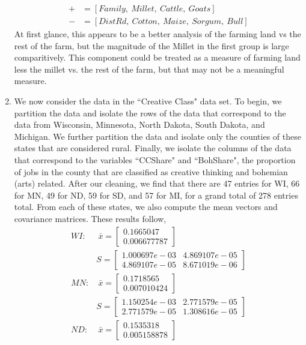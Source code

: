\documentclass[letterpaper,10pt]{article}
\begin{document}
\begin{enumerate}
\begin{align*}
+ &=[Family,\ Millet,\ Cattle,\ Goats]\\
- &=[DistRd,\ Cotton,\ Maize,\ Sorgum,\ Bull]
\end{align*}
At first glance, this appears to be a better analysis of the farming land vs the rest of the farm, but the magnitude of the Millet in the first group is large comparitively. This component could be treated as a measure of farming land less the millet vs. the rest of the farm, but that may not be a meaningful measure.
\item We now consider the data in the ``Creative Class" data set. To begin, we partition the data and isolate the rows of the data that correspond to the data from Wisconsin, Minnesota, North Dakota, South Dakota, and Michigan. We further partition the data and isolate only the counties of these states that are considered rural. Finally, we isolate the columns of the data that correspond to the variables ``CCShare" and ``BohShare", the proportion of jobs in the county that are classified as creative thinking and bohemian (arts) related. After our cleaning, we find that there are 47 entries for WI, 66 for MN, 49 for ND, 59 for SD, and 57 for MI, for a grand total of 278 entries total. From each of these states, we also compute the mean vectors and covariance matrices. These results follow,
\begin{align*}
WI: &\  \bar{x}=\begin{bmatrix}
0.1665047\\0.006677787
\end{bmatrix}\\
& S = \begin{bmatrix}
1.000697e-03 & 4.869107e-05\\
4.869107e-05 & 8.671019e-06
\end{bmatrix}\\
MN: &\  \bar{x}=\begin{bmatrix}
0.1718565\\ 0.007010424
\end{bmatrix}\\
& S = \begin{bmatrix}
1.150254e-03 & 2.771579e-05\\
2.771579e-05 & 1.308616e-05
\end{bmatrix}\\
ND: &\  \bar{x}=\begin{bmatrix}
0.1535318\\ 0.005158878
\end{bmatrix}\\

\end{align*}
\end{enumerate}
\end{document}

